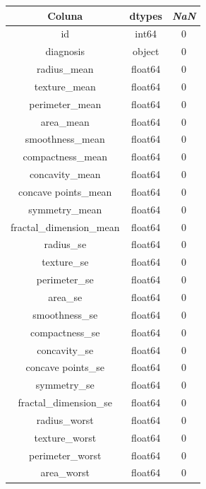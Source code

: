 \begin{table}[H]
\label{descritivo:cancer}
\centering
\begin{tabular}{|c|c|c|}
\hline
\textbf{Coluna} & \textbf{dtypes} & \textbf{\textit{NaN}}\\
\hline
id                         &  int64 & 0 \\
\hline
diagnosis                  & object & 0 \\
\hline
radius\_mean               & float64 & 0 \\
\hline
texture\_mean             &  float64 & 0 \\
\hline
perimeter\_mean           &  float64 & 0 \\
\hline
area\_mean               &   float64 & 0 \\
\hline
smoothness\_mean          &  float64 & 0 \\
\hline
compactness\_mean         &  float64 & 0 \\
\hline
concavity\_mean          &   float64 & 0 \\
\hline
concave points\_mean      &  float64 & 0 \\
\hline
symmetry\_mean            &  float64 & 0 \\
\hline
fractal\_dimension\_mean   &  float64 & 0 \\
\hline
radius\_se                &  float64 & 0 \\
\hline
texture\_se              &   float64 & 0 \\
\hline
perimeter\_se            &   float64 & 0 \\
\hline
area\_se                 &   float64 & 0 \\
\hline
smoothness\_se           &   float64 & 0 \\
\hline
compactness\_se          &   float64 & 0 \\
\hline
concavity\_se            &   float64 & 0 \\
\hline
concave points\_se       &   float64 & 0 \\
\hline
symmetry\_se             &   float64 & 0 \\
\hline
fractal\_dimension\_se   &    float64 & 0 \\
\hline
radius\_worst           &    float64 & 0 \\
\hline
texture\_worst         &     float64 & 0 \\
\hline
perimeter\_worst       &     float64 & 0 \\
\hline
area\_worst            &     float64 & 0 \\

\end{tabular}
\end{table}

